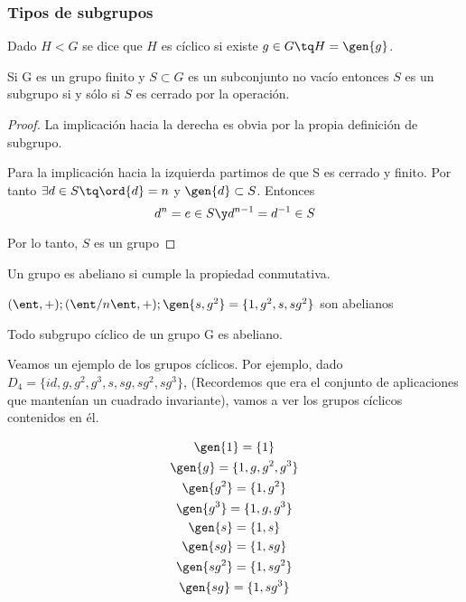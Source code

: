 \documentclass[nochap]{apuntes}
\begin{document}
\subsubsection{Tipos de subgrupos}
\begin{defn}
   Dado $H<G$ se dice que $H$ es cíclico si existe $g\in G \tq H=\gen{g}$.
  \end{defn}

  \begin{theorem}
   Si G es un grupo finito y $S\subset G$ es un subconjunto no vacío entonces $S$ es un subgrupo si y sólo si $S$ es cerrado por la operación.
  \end{theorem}

  \begin{proof}
   La implicación hacia la derecha es obvia por la propia definición de subgrupo.

   Para la implicación hacia la izquierda partimos de que S es cerrado y finito. Por tanto $\exists d \in S \tq \ord{d}=n$ y $\gen{d} \subset S$. Entonces
\[ d^{n}=e\in S \y d^{n-1}=d^{-1}\in S\]

Por lo tanto, $S$ es un grupo
  \end{proof}

  \begin{defn}
   Un grupo es abeliano si cumple la propiedad conmutativa.
  \end{defn}

  \begin{example}  $(\ent, +); (\ent/n\ent, +); \gen{s,g^{2}} =\{1,g^{2},s,sg^{2}\}$ son abelianos
  \end{example}

  \begin{lemma}
   Todo subgrupo cíclico de un grupo G es abeliano.
  \end{lemma}

Veamos un ejemplo de los grupos cíclicos. Por ejemplo, dado $D_{4}=\{id, g, g^{2}, g^{3}, s, sg, sg^{2},sg^{3}\}$, (Recordemos que era el conjunto de aplicaciones que mantenían un cuadrado invariante), vamos a ver los grupos cíclicos contenidos en él.

  \begin{gather*}
  \gen{1}=\{1\} \\
  \gen{g} =\{1,g,g^{2}, g^{3}\}\\
  \gen{g^{2}}=\{1,g^{2}\}\\
  \gen{g^{3}}=\{1,g, g^{3}\}\\
  \gen{s} =\{1,s\}\\
  \gen{sg}=\{1, sg\}\\
  \gen{sg^{2}} =\{1, sg^{2}\}\\
  \gen{sg}=\{1, sg^{3}\}
  \end{gather*}
\end{document}
